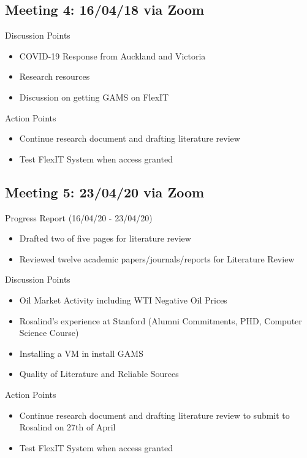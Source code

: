 \documentclass[12pt]{article}
\begin{document}
\subsection{Meeting 4: 16/04/18 via Zoom}
    Discussion Points
        \begin{itemize}
            \item COVID-19 Response from Auckland and Victoria
            \item Research resources
            \item Discussion on getting GAMS on FlexIT
        \end{itemize}
    Action Points
        \begin{itemize}
            \item Continue research document and drafting literature review
            \item Test FlexIT System when access granted
        \end{itemize}
\subsection{Meeting 5: 23/04/20 via Zoom}
Progress Report (16/04/20 - 23/04/20)
\begin{itemize}
    \item Drafted two of five pages for literature review
    \item Reviewed twelve academic papers/journals/reports for Literature Review
\end{itemize}
Discussion Points
    \begin{itemize}
        \item Oil Market Activity including WTI Negative Oil Prices
        \item Rosalind's experience at Stanford (Alumni Commitments, PHD, Computer Science Course)
        \item Installing a VM in install GAMS
        \item Quality of Literature and Reliable Sources
    \end{itemize}
Action Points
    \begin{itemize}
        \item Continue research document and drafting literature review to submit to Rosalind on 27th of April
        \item Test FlexIT System when access granted
    \end{itemize}
\end{document}
